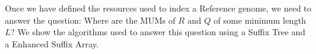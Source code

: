 \documentclass[runningheads,a4paper]{llncs}
\begin{document}
%
Once we have defined the resources used to index a Reference genome, we need to answer the question: Where are the MUMs of $R$ and $Q$ of some minimum length $L$? We show the algorithms used to answer this question using a Suffix Tree and a Enhanced Suffix Array.
\end{document}
